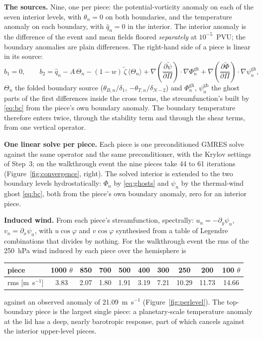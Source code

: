 \documentclass[11pt,a4paper]{article}
\newcommand{\px}{\partial_x}
\newcommand{\py}{\partial_y}
\newcommand{\dd}[2]{\frac{\partial #1}{\partial #2}}
\newcommand{\grad}{\nabla}
\begin{document}
\textbf{The sources.} Nine, one per piece: the potential-vorticity anomaly on
each of the seven interior levels, with $\theta_n=0$ on both boundaries, and
the temperature anomaly on each boundary, with $\hat q_n=0$ in the interior.
The interior anomaly is the difference of the event and mean fields floored
\emph{separately} at $10^{-5}$~PVU; the boundary anomalies are plain
differences. The right-hand side of a piece is linear in its source:
\begin{equation}
b_1 = 0,
\qquad
b_2 = \hat q_n
 - A\,\Theta_n
 - (1-w)\,\tilde\zeta\,\big\langle\Theta_n\big\rangle
 + \grad\!\left(\dd{\tilde\psi}{\Pi}\right)\cdot\grad\Phi^{\text{gh}}_{n}
 + \grad\!\left(\dd{\tilde\Phi}{\Pi}\right)\cdot\grad\psi^{\text{gh}}_{n},
\label{eq:rhs}
\end{equation}
$\Theta_n$ the folded boundary source ($\theta_{B,n}/\delta_1$,
$-\theta_{T,n}/\delta_{N-2}$) and $\Phi^{\text{gh}}_n$, $\psi^{\text{gh}}_n$
the ghost parts of the first differences inside the cross terms, the
streamfunction's built by \eqref{eq:bc} from the piece's own boundary anomaly.
The boundary temperature therefore enters twice, through the stability term
and through the shear terms, from one vertical operator.

\textbf{One linear solve per piece.} Each piece is one preconditioned GMRES
solve against the same operator and the same preconditioner, with the Krylov
settings of Step~3; on the walkthrough event the nine pieces take 44 to 61
iterations (Figure~\ref{fig:convergence}, right). The solved interior is
extended to the two boundary levels hydrostatically: $\Phi_n$ by
\eqref{eq:ghosts} and $\psi_n$ by the thermal-wind ghost \eqref{eq:bc}, both
from the piece's own boundary anomaly, zero for an interior piece.

\textbf{Induced wind.} From each piece's streamfunction, spectrally:
$u_n=-\py\psi_n$, $v_n=\px\psi_n$, with $u\cos\varphi$ and $v\cos\varphi$
synthesised from a table of Legendre combinations that divides by nothing.
For the walkthrough event the rms of the 250~hPa wind induced by each piece over
the hemisphere is
\begin{center}
\small
\begin{tabular}{lccccccccc}
\toprule
piece & 1000 $\theta$ & 850 & 700 & 500 & 400 & 300 & 250 & 200 & 100 $\theta$ \\
\midrule
rms [m~s$^{-1}$] & 3.83 & 2.07 & 1.80 & 1.91 & 3.19 & 7.21 & 10.29 & 11.73 & 14.66 \\
\bottomrule
\end{tabular}
\end{center}
against an observed anomaly of 21.09~m~s$^{-1}$ (Figure~\ref{fig:perlevel}).
The top-boundary piece is the largest single piece: a planetary-scale
temperature anomaly at the lid has a deep, nearly barotropic response, part of
which cancels against the interior upper-level pieces.
\end{document}
